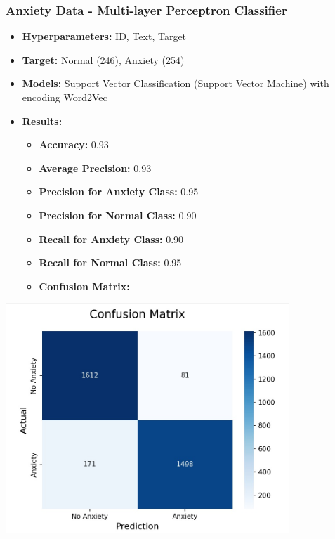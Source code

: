 \documentclass[a4paper,12pt]{article}
\begin{document}
\vspace{0.5cm} %

\subsubsection{Anxiety Data - Multi-layer Perceptron Classifier}

\begin{itemize}
    \item \textbf{Hyperparameters:} ID, Text, Target
    \item \textbf{Target:} Normal (246), Anxiety (254)
    \item \textbf{Models:} Support Vector Classification (Support Vector Machine) with encoding Word2Vec
    \item \textbf{Results:}
    \begin{itemize}
        \item \textbf{Accuracy:} 0.93
        \item \textbf{Average Precision:} 0.93
        \item \textbf{Precision for Anxiety Class:} 0.95
        \item \textbf{Precision for Normal Class:} 0.90
        \item \textbf{Recall for Anxiety Class:} 0.90
        \item \textbf{Recall for Normal Class:} 0.95
        \item \textbf{Confusion Matrix:}
    \end{itemize}
\end{itemize}

\begin{center}
    \includegraphics[width=0.8\textwidth]{Anxiety-Data-MLPClassifier.jpg} %
\end{center}
\end{document}
